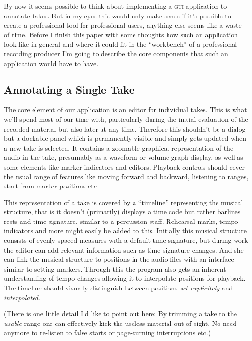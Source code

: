 \documentclass[11pt,a4paper]{article}
\begin{document}
By now it seems possible to think about implementing a \textsc{gui} application to annotate takes.
But in my eyes this would only make sense if it's possible to create a professional tool for professional users, anything else seems like a waste of time.
Before I finish this paper with some thoughts how such an application look like in general and where it could fit in the “workbench” of a professional recording producer I'm going to describe the core components that such an application would have to have.

\subsection{Annotating a Single Take}
The core element of our application is an editor for individual takes.
This is what we'll spend most of our time with, particularly during the initial evaluation of the recorded material but also later at any time.
Therefore this shouldn't be a dialog but a dockable panel which is permanently visible and simply gets updated when a new take is selected.
It contains a zoomable graphical representation of the audio in the take, presumably as a waveform or volume graph display, as well as some elements like marker indicators and editors.
Playback controls should cover the usual range of features like moving forward and backward, listening to ranges, start from marker positions etc.

This representation of a take is covered by a “timeline” representing the musical structure, that is it doesn't (primarily) displays a time code but rather barlines rests and time signature, similar to a percussion staff.
Rehearsal marks, tempo indicators and more might easily be added to this.
Initially this musical structure consists of evenly spaced measures with a default time signature, but during work the editor can add relevant information such as time signature changes.
And she can link the musical structure to positions in the audio files with an interface similar to setting markers.
Through this the program also gets an inherent understanding of tempo changes allowing it to interpolate positions for playback.
The timeline should visually distinguish between positions \emph{set explicitely} and \emph{interpolated}.

(There is one little detail I'd like to point out here: By trimming a take to the \emph{usable} range one can effectively kick the useless material out of sight.
No need anymore to re-listen to false starts or page-turning interruptions etc.)
\end{document}
